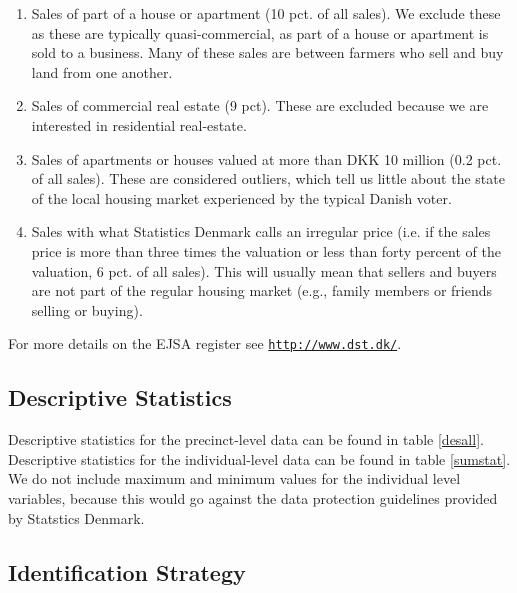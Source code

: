 \documentclass[12pt,a4paper]{article}
\begin{document}
	\begin{enumerate}
		\item Sales of part of a house or apartment (10 pct. of all sales). We exclude these as these are typically quasi-commercial, as part of a house or apartment is sold to a business. Many of these sales are between farmers who sell and buy land from one another.
		\item Sales of commercial real estate (9 pct). These are excluded because we are interested in residential real-estate.
		\item Sales of apartments or houses valued at more than DKK 10 million (0.2 pct. of all sales). These are considered outliers, which tell us little about the state of the local housing market experienced by the typical Danish voter.
		\item Sales with what Statistics Denmark calls an irregular price (i.e. if the sales price is more than three times the valuation or less than forty percent of the valuation, 6 pct. of all sales). This will usually mean that sellers and buyers are not part of the regular housing market (e.g., family members or friends selling or buying).
	\end{enumerate}
	
	For more details on the EJSA register see \texttt{\href{http://www.dst.dk/extranet/ForskningVariabellister/EJSA\%20-\%20Ejendomme\%20salgsoplysninger.html}{http://www.dst.dk/}}.

	\newpage		
			\subsection{Descriptive Statistics} \label{sumstats}
			\setcounter{table}{0}
			
			Descriptive statistics for the precinct-level data can be found in table \ref{desall}. Descriptive statistics for the individual-level data can be found in table \ref{sumstat}. We do not include maximum and minimum values for the individual level variables, because this would go against the data protection guidelines provided by Statstics Denmark.
			
			
			
			
			
			\newpage
			
			\subsection{Identification Strategy}
			
\end{document}
